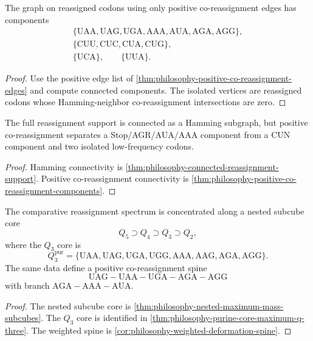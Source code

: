 \begin{theorem}
\label{thm:philosophy-positive-co-reassignment-components}
The graph on reassigned codons using only positive co-reassignment edges
has components
$$
\begin{gathered}
  \{\mathrm{UAA},\mathrm{UAG},\mathrm{UGA},
    \mathrm{AAA},\mathrm{AUA},\mathrm{AGA},\mathrm{AGG}\},\\
  \{\mathrm{CUU},\mathrm{CUC},\mathrm{CUA},\mathrm{CUG}\},\\
  \{\mathrm{UCA}\},\qquad \{\mathrm{UUA}\}.
\end{gathered}
$$
\end{theorem}
\begin{proof}
Use the positive edge list of
\autoref{thm:philosophy-positive-co-reassignment-edges} and compute
connected components. The isolated vertices are reassigned codons whose
Hamming-neighbor co-reassignment intersections are zero.
\end{proof}

\begin{corollary}
\label{cor:philosophy-geometric-and-co-reassignment-support-differ}
The full reassignment support is connected as a Hamming subgraph, but
positive co-reassignment separates a Stop/AGR/AUA/AAA component from a
CUN component and two isolated low-frequency codons.
\end{corollary}
\begin{proof}
Hamming connectivity is
\autoref{thm:philosophy-connected-reassignment-support}. Positive
co-reassignment connectivity is
\autoref{thm:philosophy-positive-co-reassignment-components}.
\end{proof}

\begin{theorem}
\label{thm:philosophy-nested-core-comparative-dynamics-statement}
The comparative reassignment spectrum is concentrated along a nested
subcube core
$$
  Q_{5}\supset Q_{4}\supset Q_{3}\supset Q_{2},
$$
where the $Q_{3}$ core is
$$
  Q_{3}^{\mathrm{pur}}
  =
  \{\mathrm{UAA},\mathrm{UAG},\mathrm{UGA},\mathrm{UGG},
    \mathrm{AAA},\mathrm{AAG},\mathrm{AGA},\mathrm{AGG}\}.
$$
The same data define a positive co-reassignment spine
$$
  \mathrm{UAG}-\mathrm{UAA}-\mathrm{UGA}-\mathrm{AGA}-\mathrm{AGG}
$$
with branch $\mathrm{AGA}-\mathrm{AAA}-\mathrm{AUA}$.
\end{theorem}
\begin{proof}
The nested subcube core is
\autoref{thm:philosophy-nested-maximum-mass-subcubes}. The $Q_{3}$ core
is identified in \autoref{thm:philosophy-purine-core-maximum-q-three}.
The weighted spine is
\autoref{cor:philosophy-weighted-deformation-spine}.
\end{proof}

